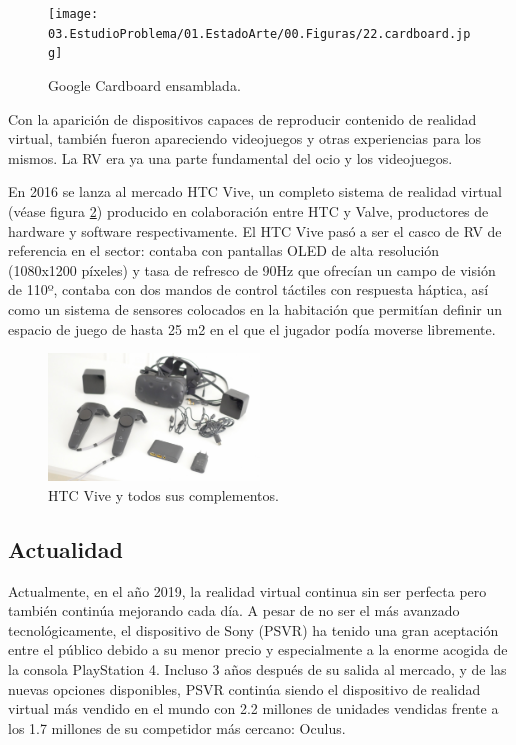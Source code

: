 \begin{figure}
  \centering
\texttt{[image: 03.EstudioProblema/01.EstadoArte/00.Figuras/22.cardboard.jpg]}
    \caption{Google Cardboard ensamblada. \cite{EA_img_cardboard}}
    \label{fig:EA_cardboard}
\end{figure}


Con la aparición de dispositivos capaces de reproducir contenido de realidad virtual, también fueron apareciendo videojuegos y otras experiencias para los mismos. La RV era ya una parte fundamental del ocio y los videojuegos.

En 2016 se lanza al mercado HTC Vive, un completo sistema de realidad virtual (véase figura \ref{fig:EA_vive}) producido en colaboración entre HTC y Valve, productores de hardware y software respectivamente. El HTC Vive pasó a ser el casco de RV de referencia en el sector: contaba con pantallas OLED de alta resolución (1080x1200 píxeles) y tasa de refresco de 90Hz que ofrecían un campo de visión de 110º, contaba con dos mandos de control táctiles con respuesta háptica, así como un sistema de sensores colocados en la habitación que permitían definir un espacio de juego de hasta 25 m2 en el que el jugador podía moverse libremente.


\begin{figure}
  \centering
\includegraphics[width=0.5\textwidth]{03.EstudioProblema/01.EstadoArte/00.Figuras/23.htc_vive.jpeg}
    \caption{HTC Vive y todos sus complementos. \cite{EA_img_vive}}
    \label{fig:EA_vive}
\end{figure}


\subsection{Actualidad}


Actualmente, en el año 2019, la realidad virtual continua sin ser perfecta pero también continúa mejorando cada día. A pesar de no ser el más avanzado tecnológicamente, el dispositivo de Sony (PSVR) ha tenido una gran aceptación entre el público debido a su menor precio y especialmente a la enorme acogida de la consola PlayStation 4. Incluso 3 años después de su salida al mercado, y de las nuevas opciones disponibles, PSVR continúa siendo el dispositivo de realidad virtual más vendido en el mundo con 2.2 millones de unidades vendidas frente a los 1.7 millones de su competidor más cercano: Oculus.

